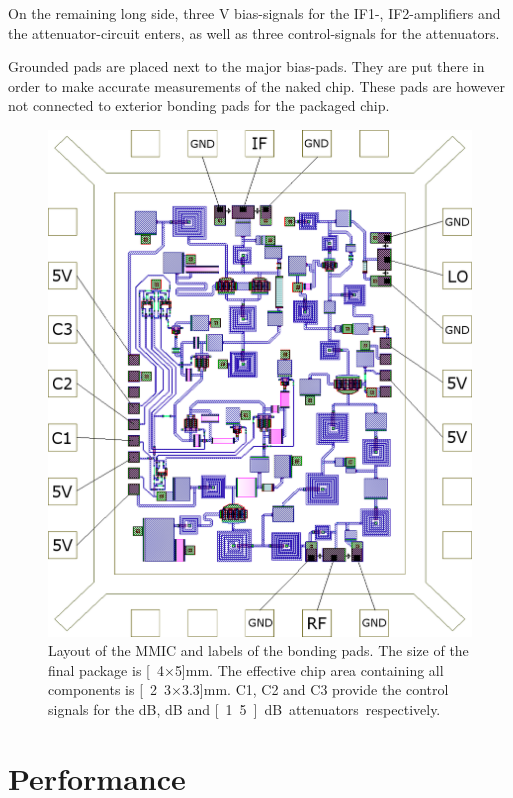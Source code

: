		On the remaining long side, three \unit[5]{V} bias-signals for the IF1-, IF2-amplifiers and the attenuator-circuit enters, as well as three control-signals for the attenuators.
		
		Grounded pads are placed next to the major bias-pads. They are put there in order to make accurate measurements of the naked chip. These pads are however not connected to exterior bonding pads for the packaged chip.

		\begin{figure}[hbt!]
			\centering
			\includegraphics[width=1.0\textwidth]{fig/summary/package}
			\caption[Layout of the pad-structure.]{Layout of the MMIC and labels of the bonding pads. The size of the final package is \unit[4$\times$5]{mm}. The effective chip area containing all components is \unit[2.3$\times$3.3]{mm}. C1, C2 and C3 provide the control signals for the \unit[6]{dB}, \unit[3]{dB} and \unit[1.5]{dB} attenuators respectively.}\label{fig:final_chip}
		\end{figure}

	\section{Performance}

